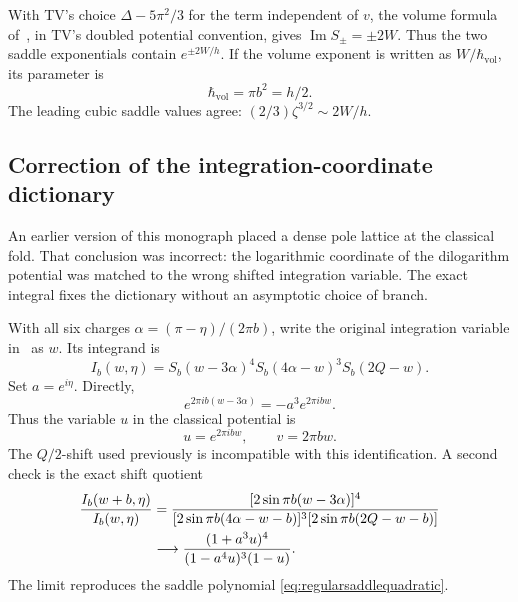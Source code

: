 \documentclass[11pt,a4paper]{article}
\numberwithin{equation}{section}
\theoremstyle{definition}
\theoremstyle{remark}
\begin{document}
With TV's choice $\Delta-5\pi^2/3$ for the term independent of
$v$, the volume formula of~\cite{MurakamiYano}, in TV's doubled
potential convention, gives
$\operatorname{Im}S_\pm=\pm2W$. Thus the two saddle
exponentials contain $e^{\pm2W/h}$. If the volume exponent
is written as $W/\hbar_{\mathrm{vol}}$, its parameter is
\begin{equation}
 \hbar_{\mathrm{vol}}=\pi b^2=h/2.
 \label{eq:TVvolumehbar}
\end{equation}
The leading cubic saddle values agree:
$(2/3)\zeta^{3/2}\sim2W/h$.

\subsection{Correction of the integration-coordinate dictionary}

An earlier version of this monograph placed a dense pole lattice at the
classical fold. That conclusion was incorrect: the logarithmic coordinate
of the dilogarithm potential was matched to the wrong shifted integration
variable. The exact integral fixes the dictionary without an asymptotic
choice of branch.

With all six charges $\alpha=(\pi-\eta)/(2\pi b)$, write the
original integration variable in~\cite[eq.~(2.27)]{TeschnerVartanov}
as $w$. Its integrand is
\begin{equation}
 I_b(w,\eta)=S_b(w-3\alpha)^4
             S_b(4\alpha-w)^3S_b(2Q-w).
 \label{eq:regularquantumintegrand}
\end{equation}
Set $a=e^{i\eta}$. Directly,
\[
 e^{2\pi ib(w-3\alpha)}=-a^3e^{2\pi ibw}.
\]
Thus the variable $u$ in the classical potential is
\begin{equation}
 u=e^{2\pi ibw},\qquad v=2\pi bw.
 \label{eq:correctquantumcoordinate}
\end{equation}
The $Q/2$-shift used previously is incompatible with this
identification. A second check is the exact shift quotient
\begin{align}
 \frac{I_b(w+b,\eta)}{I_b(w,\eta)}
 &=
 \frac{[2\sin\pi b(w-3\alpha)]^4}
 {[2\sin\pi b(4\alpha-w-b)]^3
  [2\sin\pi b(2Q-w-b)]}\notag\\
 &\longrightarrow
 \frac{(1+a^3u)^4}{(1-a^4u)^3(1-u)}.
 \label{eq:exactintegrandquotient}
\end{align}
The limit reproduces the saddle polynomial
\eqref{eq:regularsaddlequadratic}.
\end{document}

